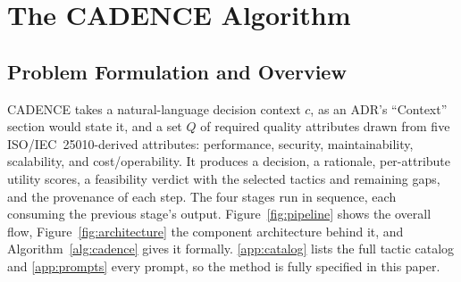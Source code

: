 \documentclass[preprint,12pt,authoryear]{elsarticle}
\renewcommand{\_}{\textunderscore\allowbreak{}}
\begin{document}
\section{The CADENCE Algorithm}
\label{sec:method}

\subsection{Problem Formulation and Overview}

CADENCE takes a natural-language decision context $c$, as an ADR's ``Context'' section would state it, and a set $Q$ of required quality attributes drawn from five ISO/IEC~25010-derived attributes: performance, security, maintainability, scalability, and cost/operability. It produces a decision, a rationale, per-attribute utility scores, a feasibility verdict with the selected tactics and remaining gaps, and the provenance of each step. The four stages run in sequence, each consuming the previous stage's output. Figure~\ref{fig:pipeline} shows the overall flow, Figure~\ref{fig:architecture} the component architecture behind it, and Algorithm~\ref{alg:cadence} gives it formally. \ref{app:catalog} lists the full tactic catalog and \ref{app:prompts} every prompt, so the method is fully specified in this paper.
\end{document}
